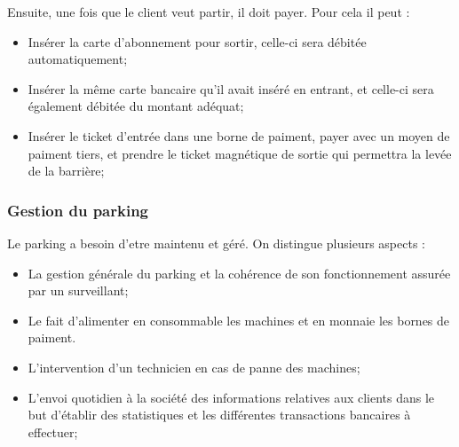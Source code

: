 \documentclass[a4paper]{article}
\begin{document}
Ensuite, une fois que le client veut partir, il doit payer. Pour cela il peut :
\begin{itemize}
		\item Ins\'erer la carte d'abonnement pour sortir, celle-ci sera d\'ebit\'ee automatiquement;
		\item Ins\'erer la m\^eme carte bancaire qu'il avait ins\'er\'e en entrant, et celle-ci sera \'egalement d\'ebit\'ee du montant ad\'equat;
		\item Ins\'erer le ticket d'entr\'ee dans une borne de paiment, payer avec un moyen de paiment tiers, et prendre le ticket magn\'etique de sortie qui permettra la lev\'ee de la barri\`ere;
\end{itemize}

\subsubsection{Gestion du parking}
Le parking a besoin d'etre maintenu et g\'er\'e. On distingue plusieurs aspects :
\begin{itemize}
		\item La gestion g\'en\'erale du parking et la coh\'erence de son fonctionnement assur\'ee par un surveillant;
		\item Le fait d'alimenter en consommable les machines et en monnaie les bornes de paiment.
		\item L'intervention d'un technicien en cas de panne des machines;
		\item L'envoi quotidien \`a la soci\'et\'e des informations relatives aux clients dans le but d'\'etablir des statistiques et les diff\'erentes transactions bancaires \`a effectuer;
\end{itemize}
\end{document}
